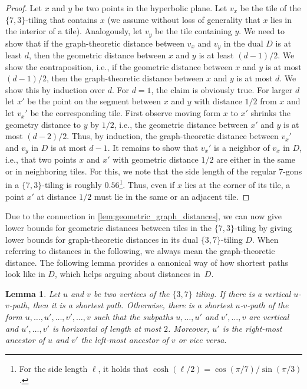 \documentclass[11pt]{article}
\newtheorem{lemma}[theorem]{Lemma}
\begin{document}
%
\begin{proof}
    Let $x$ and $y$ be two points in the hyperbolic plane.
    Let $v_x$ be the tile of the $\{7, 3\}$-tiling that contains $x$ (we assume without loss of generality that $x$ lies in the interior of a tile).
    Analogously, let $v_y$ be the tile containing $y$.
    We need to show that if the graph-theoretic distance between $v_x$ and $v_y$ in the dual $D$ is at least $d$, then the geometric distance between $x$ and $y$ is at least $(d - 1) / 2$.
    We show the contraposition, i.e., if the geometric distance between $x$ and $y$ is at most $(d - 1) / 2$, then the graph-theoretic distance between $x$ and $y$ is at most $d$.
%
    We show this by induction over $d$.
    For $d = 1$, the claim is obviously true.
    For larger $d$ let $x'$ be the point on the segment between $x$ and $y$ with distance $1/2$ from $x$ and let $v_x'$ be the corresponding tile.
    First observe moving form $x$ to $x'$ shrinks the geometry distance to $y$ by $1/2$, i.e., the geometric distance between $x'$ and $y$ is at most $(d - 2) / 2$.
    Thus, by induction, the graph-theoretic distance between $v_x'$ and $v_y$ in $D$ is at most $d - 1$.
    It remains to show that $v_x'$ is a neighbor of $v_x$ in $D$, i.e., that two points $x$ and $x'$ with geometric distance $1/2$ are either in the same or in neighboring tiles.
    For this, we note that the side length of the regular $7$-gons in a $\{7, 3\}$-tiling is roughly $0.56$\footnote{For the side length $\ell$, it holds that $\cosh(\ell / 2) = \cos(\pi / 7) / \sin(\pi / 3)$.}.
    Thus, even if $x$ lies at the corner of its tile, a point $x'$ at distance $1/2$ must lie in the same or an adjacent tile.
\end{proof}
%
Due to the connection in \cref{lem:geometric_graph_distances}, we can now give lower bounds for geometric distances between tiles in the $\{7, 3\}$-tiling by giving lower bounds for graph-theoretic distances in its dual $\{3, 7\}$-tiling $D$.
When referring to distances in the following, we always mean the graph-theoretic distance.
The following lemma provides a canonical way of how shortest paths look like in $D$, which helps arguing about distances in~$D$.
%
\begin{lemma}
    \label{lem:3_7_tiling_shorest_paths}
    Let $u$ and $v$ be two vertices of the $\{3, 7\}$ tiling.
    If there is a vertical $u$-$v$-path, then it is a shortest path.
    Otherwise, there is a shortest $u$-$v$-path of the form $u, \dots, u', \dots, v', \dots, v$ such that the subpaths $u, \dots, u'$ and $v', \dots, v$ are vertical and $u', \dots, v'$ is horizontal of length at most $2$.
    Moreover, $u'$ is the right-most ancestor of $u$ and $v'$ the left-most ancestor of $v$ or vice versa.
\end{lemma}
\end{document}
